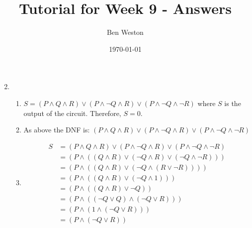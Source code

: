 \documentclass{article}
\title{Tutorial for Week 9 - Answers}
\author{Ben Weston}
\date{\today}
\begin{document}
\maketitle
\begin{enumerate}\setcounter{enumi}{1}
        \item{
                        \begin{enumerate}
                                \item $S=(P\wedge Q\wedge R)\vee(P\wedge\neg Q\wedge R)\vee(P\wedge\neg Q\wedge\neg R)$ where $S$ is the output of the circuit. Therefore, $S=0$.
                                \item As above the DNF is: $(P\wedge Q\wedge R)\vee(P\wedge\neg Q\wedge R)\vee(P\wedge\neg Q\wedge\neg R)$
                                \item{        \begin{align*}
                                                        S &= (P\wedge Q\wedge R)\vee(P\wedge\neg Q\wedge R)\vee(P\wedge\neg Q\wedge\neg R)\\
                                                          &= (P\wedge((Q\wedge R)\vee(\neg Q\wedge R)\vee(\neg Q\wedge\neg R)))\\
                                                          &= (P\wedge((Q\wedge R)\vee(\neg Q\wedge(R\vee\neg R))))\\
                                                          &= (P\wedge((Q\wedge R)\vee(\neg Q \wedge 1)))\\
                                                          &= (P\wedge((Q\wedge R)\vee \neg Q))\\
                                                          &= (P\wedge((\neg Q\vee Q)\wedge(\neg Q\vee R)))\\
                                                          &= (P\wedge(1\wedge(\neg Q\vee R)))\\
                                                          &= (P\wedge(\neg Q\vee R))
                                                \end{align*}
                                        }
                        \end{enumerate}
                }
\end{enumerate}
\end{document}
